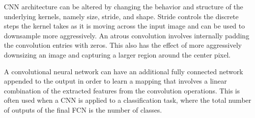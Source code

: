 CNN architecture can be altered by changing the behavior and structure of the underlying kernels, namely size, stride, and shape. Stride controls the discrete steps the kernel takes as it is moving across the input image and can be used to downsample more aggressively. An atrous convolution involves internally padding the convolution entries with zeros. This also has the effect of more aggressively downsizing an image and capturing a larger region around the center pixel.

A convolutional neural network can have an additional fully connected network appended to the output in order to learn a mapping that involves a linear combination of the extracted features from the convolution operations. This is often used when a CNN is applied to a classification task, where the total number of outputs of the final FCN is the number of classes.

